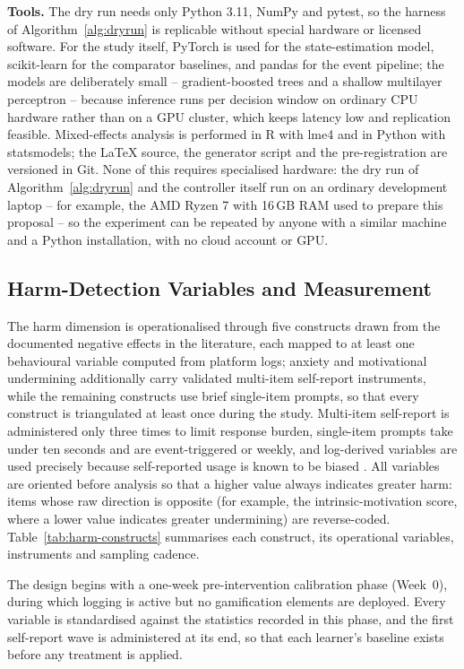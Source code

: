 \documentclass[12pt,a4paper]{article}
\begin{document}
\begin{justify}
\textbf{Tools.} The dry run needs only Python 3.11, NumPy and pytest, so the harness of
Algorithm~\ref{alg:dryrun} is replicable without special hardware or licensed software. For the
study itself, PyTorch is used for the state-estimation model, scikit-learn for the comparator
baselines, and pandas for the event pipeline; the models are deliberately small -- gradient-boosted
trees and a shallow multilayer perceptron -- because inference runs per decision window on ordinary
CPU hardware rather than on a GPU cluster, which keeps latency low and replication feasible.
Mixed-effects analysis is performed in R with lme4 and in Python with statsmodels; the LaTeX source,
the generator script and the pre-registration are versioned in Git. None of this requires
specialised hardware: the dry run of Algorithm~\ref{alg:dryrun} and the controller itself run on an
ordinary development laptop -- for example, the AMD Ryzen 7 with 16\,GB RAM used
to prepare this proposal -- so the experiment can be repeated by anyone with a similar machine and
a Python installation, with no cloud account or GPU.

\subsection{Harm-Detection Variables and Measurement}
\label{sec:harm}

The harm dimension is operationalised through five constructs drawn from the documented negative effects in the literature, each mapped to at least one behavioural variable computed from platform logs; anxiety and motivational undermining additionally carry validated multi-item self-report instruments, while the remaining constructs use brief single-item prompts, so that every construct is triangulated at least once during the study. Multi-item self-report is administered only three times to limit response burden, single-item prompts take under ten seconds and are event-triggered or weekly, and log-derived variables are used precisely because self-reported usage is known to be biased \parencite{gul2026brainrot}. All variables are oriented before analysis so that a higher value always indicates greater harm: items whose raw direction is opposite (for example, the intrinsic-motivation score, where a lower value indicates greater undermining) are reverse-coded. Table~\ref{tab:harm-constructs} summarises each construct, its operational variables, instruments and sampling cadence.

The design begins with a one-week pre-intervention calibration phase (Week~0), during which logging is active but no gamification elements are deployed. Every variable is standardised against the statistics recorded in this phase, and the first self-report wave is administered at its end, so that each learner's baseline exists before any treatment is applied.


\end{justify}
\end{document}
